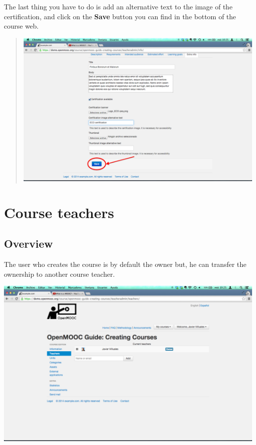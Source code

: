 \documentclass[letterpaper,10pt,english]{sphinxmanual}
\begin{document}
The last thing you have to do is add an alternative text to the image of the
certification, and click on the \textbf{Save} button you can find in the bottom of
the course web.
\begin{quote}

\includegraphics{2_course_information-13.png}
\end{quote}


\chapter{Course teachers}
\label{course_teachers:course-teachers}\label{course_teachers::doc}\label{course_teachers:id1}

\section{Overview}
\label{course_teachers:overview}
The user who creates the course is by default the owner but, he can
transfer the ownership to another course teacher.

\includegraphics{3_course_teachers-1.png}
\end{document}
